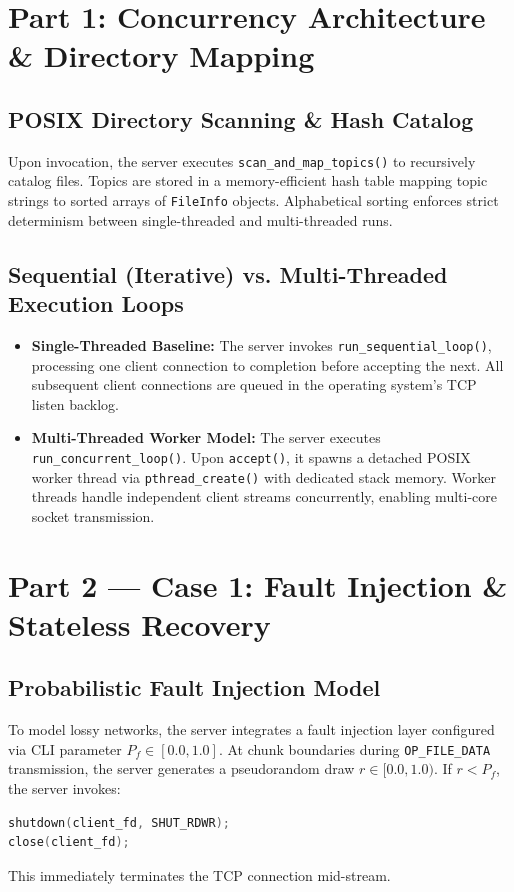 \documentclass[11pt,a4paper]{article}
\begin{document}
\section{Part 1: Concurrency Architecture \& Directory Mapping}

\subsection{POSIX Directory Scanning \& Hash Catalog}
Upon invocation, the server executes \texttt{scan\_and\_map\_topics()} to recursively catalog files. Topics are stored in a memory-efficient hash table mapping topic strings to sorted arrays of \texttt{FileInfo} objects.
Alphabetical sorting enforces strict determinism between single-threaded and multi-threaded runs.

\subsection{Sequential (Iterative) vs. Multi-Threaded Execution Loops}
\begin{itemize}[leftmargin=*]
    \item \textbf{Single-Threaded Baseline:} The server invokes \texttt{run\_sequential\_loop()}, processing one client connection to completion before accepting the next. All subsequent client connections are queued in the operating system's TCP listen backlog.
    \item \textbf{Multi-Threaded Worker Model:} The server executes \texttt{run\_concurrent\_loop()}. Upon \texttt{accept()}, it spawns a detached POSIX worker thread via \texttt{pthread\_create()} with dedicated stack memory. Worker threads handle independent client streams concurrently, enabling multi-core socket transmission.
\end{itemize}

\section{Part 2 --- Case 1: Fault Injection \& Stateless Recovery}

\subsection{Probabilistic Fault Injection Model}
To model lossy networks, the server integrates a fault injection layer configured via CLI parameter $P_f \in [0.0, 1.0]$. 
At chunk boundaries during \texttt{OP\_FILE\_DATA} transmission, the server generates a pseudorandom draw $r \in [0.0, 1.0)$. If $r < P_f$, the server invokes:
\begin{lstlisting}[language=C++]
shutdown(client_fd, SHUT_RDWR);
close(client_fd);
\end{lstlisting}
This immediately terminates the TCP connection mid-stream.
\end{document}
